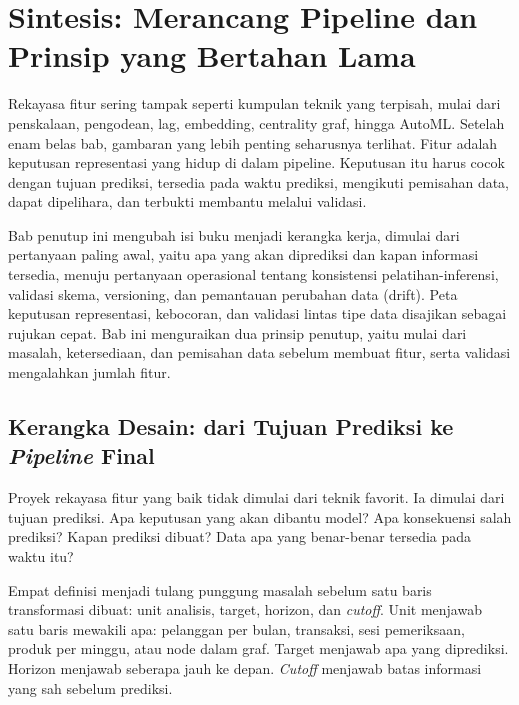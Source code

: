 \chapter{Sintesis: Merancang Pipeline dan Prinsip yang Bertahan Lama}\label{sintesis-merancang-pipeline-dan-prinsip-yang-bertahan-lama}

Rekayasa fitur sering tampak seperti kumpulan teknik yang terpisah, mulai dari penskalaan, pengodean, lag, embedding, centrality graf, hingga AutoML. Setelah enam belas bab, gambaran yang lebih penting seharusnya terlihat. Fitur adalah keputusan representasi yang hidup di dalam pipeline. Keputusan itu harus cocok dengan tujuan prediksi, tersedia pada waktu prediksi, mengikuti pemisahan data, dapat dipelihara, dan terbukti membantu melalui validasi.

Bab penutup ini mengubah isi buku menjadi kerangka kerja, dimulai dari pertanyaan paling awal, yaitu apa yang akan diprediksi dan kapan informasi tersedia, menuju pertanyaan operasional tentang konsistensi pelatihan-inferensi, validasi skema, versioning, dan pemantauan perubahan data (drift). Peta keputusan representasi, kebocoran, dan validasi lintas tipe data disajikan sebagai rujukan cepat. Bab ini menguraikan dua prinsip penutup, yaitu mulai dari masalah, ketersediaan, dan pemisahan data sebelum membuat fitur, serta validasi mengalahkan jumlah fitur.

\section{\texorpdfstring{Kerangka Desain: dari Tujuan Prediksi ke \emph{Pipeline} Final}{Kerangka Desain: dari Tujuan Prediksi ke Pipeline Final}}\label{kerangka-desain-dari-tujuan-prediksi-ke-pipeline-final}

Proyek rekayasa fitur yang baik tidak dimulai dari teknik favorit. Ia dimulai dari tujuan prediksi. Apa keputusan yang akan dibantu model? Apa konsekuensi salah prediksi? Kapan prediksi dibuat? Data apa yang benar-benar tersedia pada waktu itu?

Empat definisi menjadi tulang punggung masalah sebelum satu baris transformasi dibuat: unit analisis, target, horizon, dan \emph{cutoff}. Unit menjawab satu baris mewakili apa: pelanggan per bulan, transaksi, sesi pemeriksaan, produk per minggu, atau node dalam graf. Target menjawab apa yang diprediksi. Horizon menjawab seberapa jauh ke depan. \emph{Cutoff} menjawab batas informasi yang sah sebelum prediksi.

